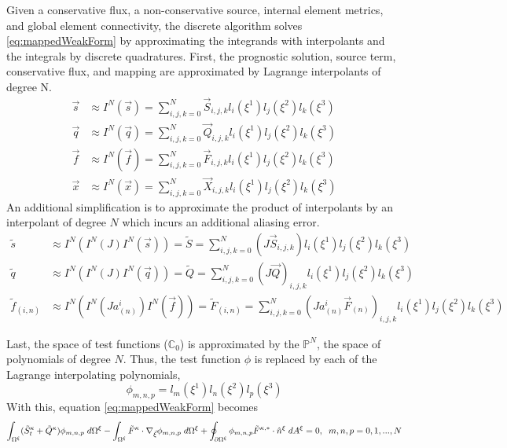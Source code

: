 \documentclass[12pt]{softwaremanual}
\begin{document}
 Given a conservative flux, a non-conservative source, internal element metrics, and global element connectivity, the discrete algorithm solves \eqref{eq:mappedWeakForm} by approximating the integrands with interpolants and the integrals by discrete quadratures. First, the prognostic solution, source term, conservative flux, and mapping are approximated by Lagrange interpolants of degree N.
 \begin{subequations}
    \begin{align}
    \vec{s} &\approx I^N(\vec{s}) = \sum_{i,j,k=0}^N \vec{S}_{i,j,k} l_i(\xi^1) l_j(\xi^2) l_k(\xi^3) \\
    \vec{q} &\approx I^N(\vec{q}) = \sum_{i,j,k=0}^N \vec{Q}_{i,j,k} l_i(\xi^1) l_j(\xi^2) l_k(\xi^3) \\
    \vec{f} &\approx I^N(\vec{f}) = \sum_{i,j,k=0}^N \vec{F}_{i,j,k} l_i(\xi^1) l_j(\xi^2) l_k(\xi^3) \\
    \vec{x} &\approx I^N( \vec{x} ) = \sum_{i,j,k=0}^N \vec{X}_{i,j,k} l_i(\xi^1) l_j(\xi^2) l_k(\xi^3)
    \end{align}
 \end{subequations}
An additional simplification is to approximate the product of interpolants by an interpolant of degree $N$ which incurs an additional aliasing error.
\begin{subequations}
    \begin{align}
    \tilde{s} &\approx I^N(I^N(J) I^N(\vec{s})) = \tilde{S} =  \sum_{i,j,k=0}^N (J \vec{S}_{i,j,k}) l_i(\xi^1) l_j(\xi^2) l_k(\xi^3) \\
    \tilde{q} &\approx I^N(I^N(J) I^N(\vec{q}))= \tilde{Q} = \sum_{i,j,k=0}^N (J \vec{Q})_{i,j,k} l_i(\xi^1) l_j(\xi^2) l_k(\xi^3) \\
    \tilde{f}_{(i,n)} &\approx I^N(I^N(Ja^i_{(n)})I^N(\vec{f}) ) =\tilde{F}_{(i,n)}= \sum_{i,j,k=0}^N (Ja^i_{(n)}\vec{F}_{(n)})_{i,j,k} l_i(\xi^1) l_j(\xi^2) l_k(\xi^3) 
    \end{align}
 \end{subequations}
 
Last, the space of test functions ($\mathbb{C}_0$) is approximated by the $\mathbb{P}^N$, the space of polynomials of degree $N$. Thus, the test function $\phi$ is replaced by each of the Lagrange interpolating polynomials, 
 \begin{equation}
 \phi_{m,n,p} = l_m(\xi^1) l_n(\xi^2) l_p(\xi^3)
 \end{equation}
 With this, equation \eqref{eq:mappedWeakForm} becomes
   \begin{equation}
  \int_{\Omega^\xi} (\tilde{S}^\kappa_t + \tilde{Q}^\kappa) \phi_{m,n,p}  \hspace{1mm} d\Omega^\xi  - \int_{\Omega^\xi} \tilde{F}^\kappa \cdot \nabla_{\vec{\xi}} \phi_{m,n,p}   \hspace{1mm} d\Omega^\xi + \oint_{\partial \Omega^\xi} \phi_{m,n,p}  \tilde{F}^{\kappa,*}  \cdot \hat{n}^\xi \hspace{1mm} d A^\xi = 0, \hspace{2mm} m,n,p=0,1,...,N  \label{eq:approx_mappedWeakForm}
  \end{equation}
  
\end{document}
